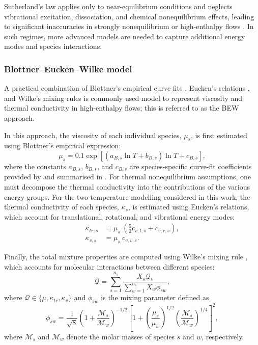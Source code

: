Sutherland's law applies only to near-equilibrium conditions and neglects vibrational excitation, dissociation, and chemical nonequilibrium effects, leading to significant inaccuracies in strongly nonequilibrium or high-enthalpy flows \citep{Vincenti1965, Park1990, miromiroThesis}. In such regimes, more advanced models are needed to capture additional energy modes and species interactions.

\subsubsection{Blottner--Eucken--Wilke model}
A practical combination of Blottner's empirical curve fits \citep{blottner1971}, Eucken's relations \citep{eucken1931}, and Wilke's mixing rules \citep{Wilke1950} is commonly used model to represent viscosity and thermal conductivity in high-enthalpy flows; this is referred to as the \gls{BEW} approach. 

In this approach, the viscosity of each individual species, $\mu_s$, is first estimated using Blottner's empirical expression:
\begin{equation}
  \mu_s = 0.1 \exp\left[\left(a_{B,s} \ln T + b_{B,s}\right) \ln T + c_{B,s}\right],
\end{equation}
where the constants $a_{B,s}$, $b_{B,s}$, and $c_{B,s}$ are species-specific curve-fit coefficients provided by \citet[Table~5-111]{blottner1971} and summarised in . For thermal nonequilibrium assumptions, one must decompose the thermal conductivity into the contributions of the various energy groups. For the two-temperature modelling considered in this work, the thermal conductivity of each species, $\kappa_s$, is estimated using Eucken's relations, which account for translational, rotational, and vibrational energy modes:
\begin{align}
  \kappa_{tr,s} &= \mu_s \ \left(\frac{5}{2} c_{v,t,s} + c_{v,r,s}\right), \\[6pt]
  \kappa_{v,s}  &= \mu_s \ c_{v,v,s}.
\end{align}

Finally, the total mixture properties are computed using Wilke's mixing rule \citep{Wilke1950}, which accounts for molecular interactions between different species:
\begin{equation}
  \mathcal{Q} =
  \sum_{s=1}^{n_s}
  \frac{X_s \mathcal{Q}_s}{\sum_{w=1}^{n_s} X_w \phi_{sw}},
\end{equation}
where $\mathcal{Q} \in \{\mu, \kappa_{tr}, \kappa_v\}$ and $\phi_{sw}$ is the mixing parameter defined as
\begin{equation}
  \phi_{sw} = \frac{1}{\sqrt{8}}
  \left(1 + \frac{\mathcal{M}_s}{\mathcal{M}_w}\right)^{-1/2}
  \left[
    1 +
    \left(\frac{\mu_s}{\mu_w}\right)^{1/2}
    \left(\frac{\mathcal{M}_s}{\mathcal{M}_w}\right)^{1/4}
  \right]^2,
\end{equation}
where $\mathcal{M}_s$ and $\mathcal{M}_w$ denote the molar masses of species $s$ and $w$, respectively.

